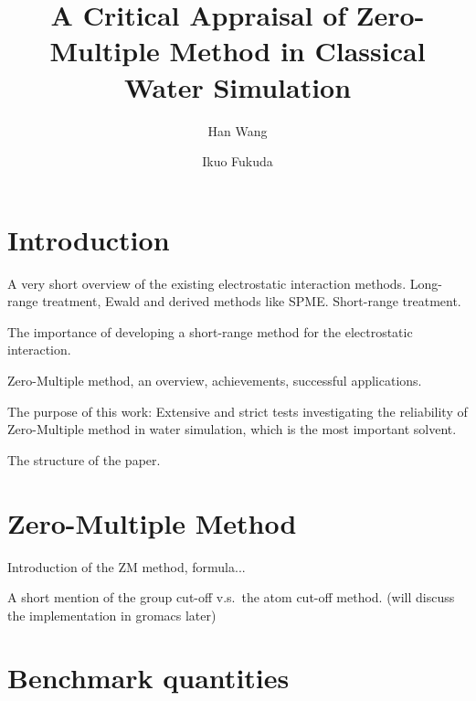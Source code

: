 \documentclass[aip,jcp,a4paper,preprint,unsortedaddress,onecolumn,fleqn]{revtex4-1}
\begin{document}
\title{A Critical Appraisal of Zero-Multiple Method in Classical Water Simulation}
\author{Han Wang}
\author{Ikuo Fukuda}

\begin{abstract}
\end{abstract}

\maketitle

\section{Introduction}

A very short overview of the existing electrostatic interaction methods.
Long-range treatment, Ewald and derived methods like SPME.
Short-range treatment.

The importance of developing a short-range method for the electrostatic interaction.

Zero-Multiple method, an overview, achievements, successful applications.

The purpose of this work: Extensive and strict tests investigating the reliability of Zero-Multiple method in water simulation, which is the most important solvent.

The structure of the paper.

\section{Zero-Multiple Method}

Introduction of the ZM method, formula...

A short mention of the group cut-off v.s.~the atom cut-off method. (will discuss the implementation in gromacs later)



\section{Benchmark quantities}
\end{document}
